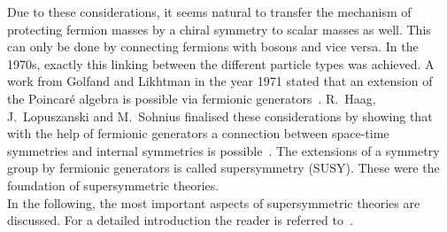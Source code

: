 Due to these considerations, it seems natural to transfer the mechanism of protecting fermion masses by a chiral symmetry to scalar masses as well.
This can only be done by connecting fermions with bosons and vice versa.
In the 1970s, exactly this linking between the different particle types was achieved.
A work from Golfand and Likhtman in the year 1971 stated that an extension of the Poincar\'e  algebra is possible via fermionic generators~\cite{bib:Golfand_Likhtman_1971}.
R.~Haag, J.~Lopuszanski and M.~Sohnius finalised these considerations by showing that with the help of fermionic generators a connection between space-time symmetries and internal symmetries is possible~\cite{bib:Haag_1974}.
The extensions of a symmetry group by fermionic generators is called supersymmetry (SUSY).
These were the foundation of supersymmetric theories.\\

In the following, the most important aspects of supersymmetric theories are discussed.
For a detailed introduction the reader is referred to~\cite{bib:Drees_1996,bib:Aitchison_2005,bib:Drees_2004}.

